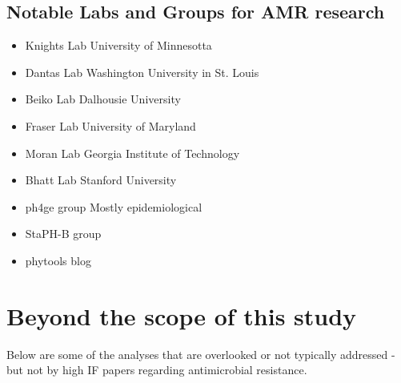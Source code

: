 \documentclass[11pt]{report}
\begin{document}
{\begin{itemize}
\subsection{Notable Labs and Groups for AMR research}
\begin{itemize}
	\item Knights Lab \dotfill University of Minnesotta
	\item Dantas Lab \dotfill Washington University in St. Louis
	\item Beiko Lab \dotfill Dalhousie University
	\item Fraser Lab \dotfill University of Maryland
	\item Moran Lab \dotfill Georgia Institute of Technology
	\item Bhatt Lab \dotfill Stanford University
	\item ph4ge group \dotfill Mostly epidemiological
	\item StaPH-B group 
	\item phytools blog
\end{itemize}
\end{itemize}

\section{Beyond the scope of this study}
Below are some of the analyses that are overlooked or not typically addressed - but not by high IF papers regarding antimicrobial resistance.
}
\end{document}
